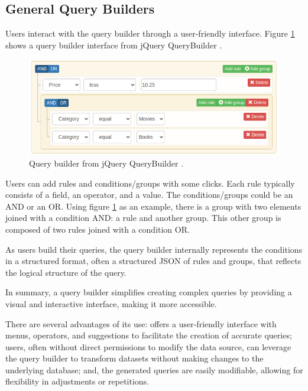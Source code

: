 \subsection{General Query Builders}


Users interact with the query builder through a user-friendly interface. Figure \ref{fig_query_builder} shows a query builder interface from jQuery QueryBuilder \cite{noauthor_jquery_nodate}.

\begin{figure}[ht]
    \includegraphics[width=14cm]{figs/chapter2/querybuilder.png}
    \centering
    \caption{Query builder from jQuery QueryBuilder \cite{noauthor_jquery_nodate}.}
    \label{fig_query_builder}
\end{figure}

Users can add rules and conditions/groups with some clicks. Each rule typically consists of a field, an operator, and a value. The conditions/groups could be an AND or an OR. Using figure \ref{fig_query_builder} as an example, there is a group with two elements joined with a condition AND: a rule and another group. This other group is composed of two rules joined with a condition OR.

As users build their queries, the query builder internally represents the conditions in a structured format, often a structured JSON of rules and groups, that reflects the logical structure of the query.

In summary, a query builder simplifies creating complex queries by providing a visual and interactive interface, making it more accessible.

There are several advantages of its use: offers a user-friendly interface with menus, operators, and suggestions to facilitate the creation of accurate queries; users, often without direct permissions to modify the data source, can leverage the query builder to transform datasets without making changes to the underlying database; and, the generated queries are easily modifiable, allowing for flexibility in adjustments or repetitions.



